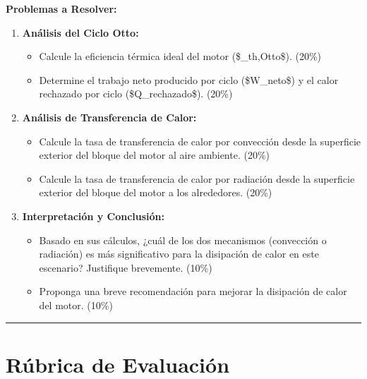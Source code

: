 \documentclass{article}
\begin{document}
\textbf{Problemas a Resolver:}

\begin{enumerate}
    \item \textbf{Análisis del Ciclo Otto:}
    \begin{itemize}
        \item Calcule la eficiencia térmica ideal del motor (\$\eta_{th,Otto}\$). (20\%)
        \item Determine el trabajo neto producido por ciclo (\$W_{neto}\$) y el calor rechazado por ciclo (\$Q_{rechazado}\$). (20\%)
    \end{itemize}
    \item \textbf{Análisis de Transferencia de Calor:}
    \begin{itemize}
        \item Calcule la tasa de transferencia de calor por convección desde la superficie exterior del bloque del motor al aire ambiente. (20\%)
        \item Calcule la tasa de transferencia de calor por radiación desde la superficie exterior del bloque del motor a los alrededores. (20\%)
    \end{itemize}
    \item \textbf{Interpretación y Conclusión:}
    \begin{itemize}
        \item Basado en sus cálculos, ¿cuál de los dos mecanismos (convección o radiación) es más significativo para la disipación de calor en este escenario? Justifique brevemente. (10\%)
        \item Proponga una breve recomendación para mejorar la disipación de calor del motor. (10\%)
    \end{itemize}
\end{enumerate}

\vspace{5mm}
\hrule
\vspace{5mm}

\section*{Rúbrica de Evaluación}
\end{document}
